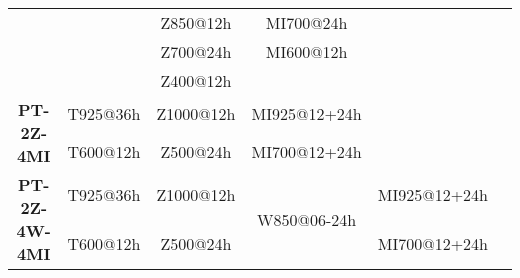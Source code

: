 \documentclass[smallextended]{svjour3}       %
\begin{document}
\begin{table*}[t]
\begin{center}
\begin{tabular}{cccccl}
				&& Z850@12h & MI700@24h && \\
				&& Z700@24h & MI600@12h && \\
				&& Z400@12h &&& \\
				\hline 
				\multirow{2}{*}{\textbf{PT-2Z-4MI}} & T925@36h & Z1000@12h & MI925@12+24h && \multirow{2}{*}{\citealt{BenDaoud2016}} \\
				& T600@12h & Z500@24h & MI700@12+24h && \\
				\hline 
				\multirow{2}{*}{\textbf{PT-2Z-4W-4MI}} & T925@36h & Z1000@12h & \multirow{2}{*}{W850@06-24h} & MI925@12+24h & \multirow{2}{*}{\citealt{BenDaoud2016}} \\
				& T600@12h & Z500@24h && MI700@12+24h & \\
				\hline 
				
			\end{tabular} 
		\end{center}
		\label{table:methods}
	\end{table*}
	
	
	
\end{document}
